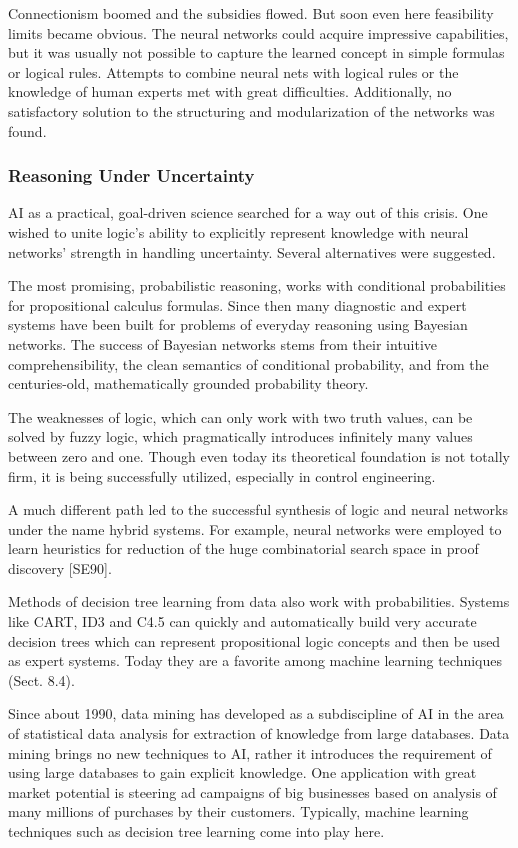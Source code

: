 \documentclass[10pt]{article}
\begin{document}
Connectionism boomed and the subsidies flowed. But soon even here feasibility limits became obvious. The neural networks could acquire impressive capabilities, but it was usually not possible to capture the learned concept in simple formulas or logical rules. Attempts to combine neural nets with logical rules or the knowledge of human experts met with great difficulties. Additionally, no satisfactory solution to the structuring and modularization of the networks was found.

\subsubsection*{Reasoning Under Uncertainty}
AI as a practical, goal-driven science searched for a way out of this crisis. One wished to unite logic's ability to explicitly represent knowledge with neural networks' strength in handling uncertainty. Several alternatives were suggested.

The most promising, probabilistic reasoning, works with conditional probabilities for propositional calculus formulas. Since then many diagnostic and expert systems have been built for problems of everyday reasoning using Bayesian\\
networks. The success of Bayesian networks stems from their intuitive comprehensibility, the clean semantics of conditional probability, and from the centuries-old, mathematically grounded probability theory.

The weaknesses of logic, which can only work with two truth values, can be solved by fuzzy logic, which pragmatically introduces infinitely many values between zero and one. Though even today its theoretical foundation is not totally firm, it is being successfully utilized, especially in control engineering.

A much different path led to the successful synthesis of logic and neural networks under the name hybrid systems. For example, neural networks were employed to learn heuristics for reduction of the huge combinatorial search space in proof discovery [SE90].

Methods of decision tree learning from data also work with probabilities. Systems like CART, ID3 and C4.5 can quickly and automatically build very accurate decision trees which can represent propositional logic concepts and then be used as expert systems. Today they are a favorite among machine learning techniques (Sect. 8.4).

Since about 1990, data mining has developed as a subdiscipline of AI in the area of statistical data analysis for extraction of knowledge from large databases. Data mining brings no new techniques to AI, rather it introduces the requirement of using large databases to gain explicit knowledge. One application with great market potential is steering ad campaigns of big businesses based on analysis of many millions of purchases by their customers. Typically, machine learning techniques such as decision tree learning come into play here.
\end{document}
